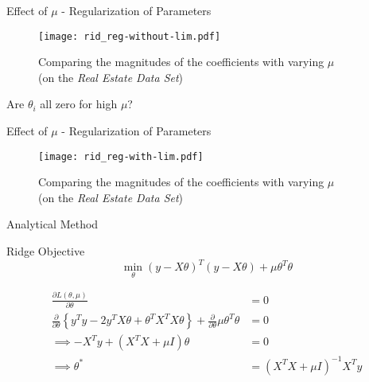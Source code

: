 \documentclass{beamer}
\begin{document}

\begin{frame}{Effect of $\mu$ - Regularization of Parameters}
\vspace{0.4cm}
\begin{figure}\texttt{[image: rid\_reg-without-lim.pdf]}\caption{Comparing the magnitudes of the coefficients with varying $\mu$\\(on the \emph{Real Estate Data Set})}
\end{figure}
\pause Are $\theta_{i}$ all zero for high $\mu$?
\end{frame}

\begin{frame}{Effect of $\mu$ - Regularization of Parameters}
\vspace{0.4cm}
\begin{figure}\texttt{[image: rid\_reg-with-lim.pdf]}\caption{Comparing the magnitudes of the coefficients with varying $\mu$\\(on the \emph{Real Estate Data Set})}
\end{figure}
\end{frame}

\begin{frame}{Analytical Method}
\begin{tcolorbox}{Ridge Objective}
\vspace{-0.4cm}
$$
\min_\theta \left(y-X\theta\right)^T\left(y-X\theta\right)+ \mu\theta^T\theta
$$
\end{tcolorbox}
\begin{align*}
\frac{\partial L\left(\theta, \mu\right)}{\partial \theta} &= 0 \\ 
\frac{\partial}{\partial \theta}\left\lbrace y^Ty - 2y^TX\theta + \theta^TX^TX\theta \right\rbrace +  \frac{\partial}{\partial \theta} \mu\theta^T\theta &= 0 \\
\implies -X^Ty + \left(X^TX + \mu I\right)\theta &= 0 \\
\implies \theta^* &= \left(X^TX + \mu I\right)^{-1}X^Ty
\end{align*}
\end{frame}
\end{document}
